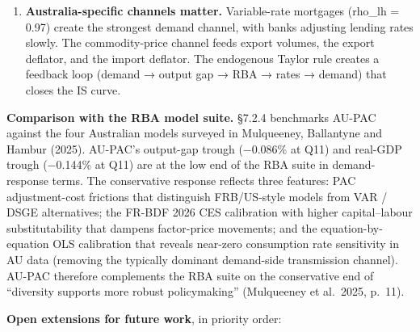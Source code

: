 \documentclass[
]{article}
\begin{document}
\begin{enumerate}
  \textbf{Higher CES substitution elasticity dampens, not amplifies, the
  IRF.} The FR-BDF 2026 recalibration raised σ from 0.34 to 0.54 ---
  well below Cobb-Douglas but more substitutable than the previous AU
  calibration. The peak responses fell modestly as a result, because
  firms with higher input substitutability require smaller factor-price
  movements to clear a demand shortfall. The structural intuition is
  well-known but its direction is often misread: higher CES elasticity
  dampens output responses when wage-price-spiral feedback (κ\_w) is
  small, as it is in AU.
\item
  \textbf{Australia-specific channels matter.} Variable-rate mortgages
  (rho\_lh = 0.97) create the strongest demand channel, with banks
  adjusting lending rates slowly. The commodity-price channel feeds
  export volumes, the export deflator, and the import deflator. The
  endogenous Taylor rule creates a feedback loop (demand → output gap →
  RBA → rates → demand) that closes the IS curve.
\end{enumerate}

\textbf{Comparison with the RBA model suite.} §7.2.4 benchmarks AU-PAC
against the four Australian models surveyed in Mulqueeney, Ballantyne
and Hambur (2025). AU-PAC's output-gap trough (−0.086\% at Q11) and
real-GDP trough (−0.144\% at Q11) are at the low end of the RBA suite in
demand-response terms. The conservative response reflects three
features: PAC adjustment-cost frictions that distinguish FRB/US-style
models from VAR / DSGE alternatives; the FR-BDF 2026 CES calibration
with higher capital--labour substitutability that dampens factor-price
movements; and the equation-by-equation OLS calibration that reveals
near-zero consumption rate sensitivity in AU data (removing the
typically dominant demand-side transmission channel). AU-PAC therefore
complements the RBA suite on the conservative end of ``diversity
supports more robust policymaking'' (Mulqueeney et al.~2025, p.~11).

\textbf{Open extensions for future work}, in priority order:
\end{document}
